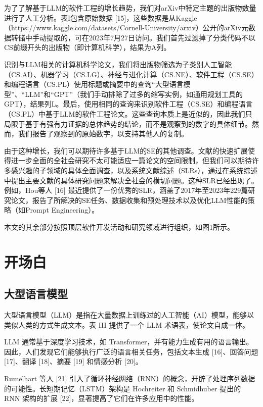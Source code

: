 \begin{translation}
为了了解基于LLM的软件工程的增长趋势，我们对arXiv中特定主题的出版物数量进行了人工分析。表I包含原始数据 [15]，这些数据是从Kaggle（https://www.kaggle.com/datasets/Cornell-University/arxiv）公开的arXiv元数据转储中手动提取的，可在2023年7月27日访问。我们首先过滤掉了分类代码不以CS前缀开头的出版物（即计算机科学），结果为A列。

识别与LLM相关的计算机科学论文，我们将出版物筛选为子类别人工智能（CS.AI）、机器学习（CS.LG）、神经与进化计算（CS.NE）、软件工程（CS.SE）和编程语言（CS.PL）使用标题或摘要中的查询“大型语言模型”、“LLM”和“GPT”（我们手动排除了过多的缩写实例，如通用规划工具的GPT），结果列L。最后，使用相同的查询来识别软件工程（CS.SE）和编程语言（CS.PL）中基于LLM的软件工程论文。这些查询本质上是近似的，因此我们只局限于基于有强有力证据的总体趋势的结论，而不是观察到的数字的具体细节。然而，我们报告了观察到的原始数字，以支持其他人的复制。

由于这种增长，我们可以期待许多基于LLM的SE的其他调查。文献的快速扩展使得进一步全面的全社会研究不太可能适应一篇论文的空间限制，但我们可以期待许多感兴趣的子领域的具体全面调查，以及系统文献综述（SLRs），通过在系统综述中提出主要文献的具体研究问题来解决全社会的横切问题。这种SLR已经出现了。例如，Hou等人 [16] 最近提供了一份优秀的SLR，涵盖了2017年至2023年229篇研究论文，报告了所解决的SE任务、数据收集和预处理技术以及优化LLM性能的策略（如Prompt Engineering）。

本文的其余部分按照顶层软件开发活动和研究领域进行组织，如图1所示。

\section{开场白}

\subsection{大型语言模型}

大型语言模型（LLM）是指在大量数据上训练过的人工智能（AI）模型，能够以类似人类的方式生成文本。表 III 提供了一个 LLM 术语表，使论文自成一体。

LLM 通常基于深度学习技术，如 Transformer，并有能力生成有用的语言输出。因此，人们发现它们能够执行广泛的语言相关任务，包括文本生成 [16]、回答问题 [17]、翻译 [18]、摘要 [19] 和情感分析 [20]。

Rumelhart 等人 [21] 引入了循环神经网络（RNN）的概念，开辟了处理序列数据的可能性。长短期记忆（LSTM）架构是 Hochreiter 和 Schmidhuber 提出的 RNN 架构的扩展 [22]，显著提高了它们在许多应用中的性能。


\end{translation}
